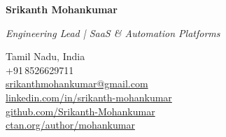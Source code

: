 \documentclass[10pt]{article}
\begin{document}
\noindent
\begin{minipage}[t]{0.55\textwidth}
    {\huge \textbf{Srikanth Mohankumar}}\\[4pt]
    {\large\raggedright\textit{Engineering Lead | SaaS \& Automation Platforms}}
\end{minipage}
\begin{minipage}[t]{0.43\textwidth}
    \raggedleft
    Tamil Nadu, India\\
    +91\,8526629711\\
    \href{mailto:srikanthmohankumar@gmail.com}{srikanthmohankumar@gmail.com}\\
    \href{https://www.linkedin.com/in/srikanth-mohankumar}{linkedin.com/in/srikanth-mohankumar}\\
    \href{https://github.com/Srikanth-Mohankumar}{github.com/Srikanth-Mohankumar}\\
    \href{https://ctan.org/author/mohankumar}{ctan.org/author/mohankumar}
\end{minipage}

\vspace{-8pt}
\end{document}
